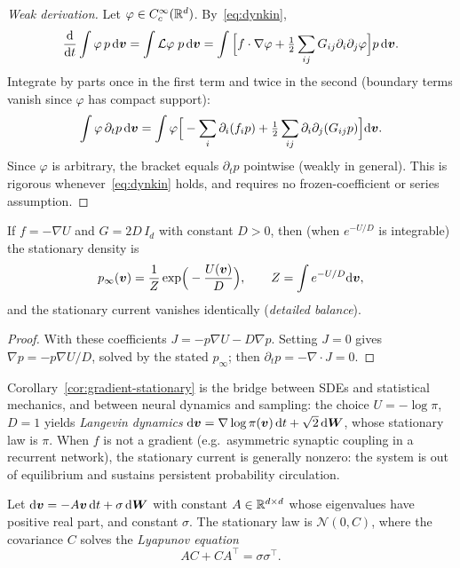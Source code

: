 \begin{proof}[Weak derivation]
Let $\varphi\in C_c^\infty(\mathbb{R}^d)$. By~\eqref{eq:dynkin},
\[
\frac{\mathrm{d}}{\mathrm{d} t}\int\varphi\,p\,\mathrm{d}\bm{v}=\int\mathcal L\varphi\;p\,\mathrm{d}\bm{v}=\int\Big[f\cdot\nabla\varphi+\tfrac12\sum_{ij}G_{ij}\partial_i\partial_j\varphi\Big]p\,\mathrm{d}\bm{v} .
\]
Integrate by parts once in the first term and twice in the second (boundary terms vanish since $\varphi$ has compact support):
\[
\int\varphi\,\partial_tp\,\mathrm{d}\bm{v}=\int\varphi\Big[-\sum_i\partial_i(f_ip)+\tfrac12\sum_{ij}\partial_i\partial_j(G_{ij}p)\Big]\mathrm{d}\bm{v} .
\]
Since $\varphi$ is arbitrary, the bracket equals $\partial_tp$ pointwise (weakly in general). This is rigorous whenever~\eqref{eq:dynkin} holds, and requires no frozen-coefficient or series assumption.
\end{proof}

\begin{corollary}
\label{cor:gradient-stationary}
If $f=-\nabla U$ and $G=2D\,I_d$ with constant $D>0$, then (when $e^{-U/D}$ is integrable) the stationary density is
\[
p_\infty(\bm{v})=\frac{1}{Z}\exp\!\Big(-\frac{U(\bm{v})}{D}\Big),\qquad Z=\int e^{-U/D}\mathrm{d}\bm{v},
\]
and the stationary current vanishes identically (\emph{detailed balance}).
\end{corollary}

\begin{proof}
With these coefficients $J=-p\nabla U-D\nabla p$. Setting $J=0$ gives $\nabla p=-p\nabla U/D$, solved by the stated $p_\infty$; then $\partial_tp=-\nabla\!\cdot\!J=0$.
\end{proof}

\noindent Corollary~\ref{cor:gradient-stationary} is the bridge between SDEs and statistical mechanics, and between neural dynamics and sampling: the choice $U=-\log\pi$, $D=1$ yields \emph{Langevin dynamics} $\mathrm{d}\bm{v}=\nabla\log\pi(\bm{v})\,\mathrm{d} t+\sqrt2\,\mathrm{d}\bm{W}$, whose stationary law is $\pi$. When $f$ is not a gradient (e.g.\ asymmetric synaptic coupling in a recurrent network), the stationary current is generally nonzero: the system is out of equilibrium and sustains persistent probability circulation.

\begin{proposition}
\label{prop:nd-ou}
Let $\mathrm{d}\bm{v}=-A\bm{v}\,\mathrm{d} t+\sigma\,\mathrm{d}\bm{W}$ with constant $A\in\mathbb{R}^{d\times d}$ whose eigenvalues have positive real part, and constant $\sigma$. The stationary law is $\mathcal N(0,C)$, where the covariance $C$ solves the \emph{Lyapunov equation}
\begin{equation}
\label{eq:lyapunov}
AC+CA^{\top}=\sigma\sigma^{\top}.
\end{equation}
\end{proposition}

